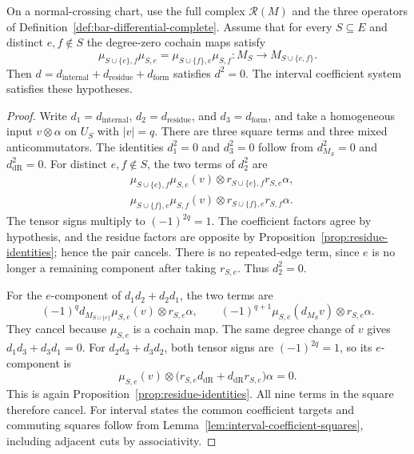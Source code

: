 \begin{theorem}
\label{thm:bar-nilpotency-complete}
On a normal-crossing chart, use the full complex $\mathcal R(M)$ and the three
operators of Definition~\ref{def:bar-differential-complete}.
Assume that for every $S\subseteq E$ and distinct $e,f\notin S$ the degree-zero
cochain maps satisfy
\[
\mu_{S\cup\{e\},f}\mu_{S,e}
=\mu_{S\cup\{f\},e}\mu_{S,f}
 :M_S\longrightarrow M_{S\cup\{e,f\}}.
\]
Then $d=d_{\mathrm{internal}}+d_{\mathrm{residue}}+d_{\mathrm{form}}$ satisfies $d^2=0$.
The interval coefficient system satisfies these hypotheses.
\end{theorem}

\begin{proof}
Write $d_1=d_{\mathrm{internal}}$, $d_2=d_{\mathrm{residue}}$,
and $d_3=d_{\mathrm{form}}$, and take a homogeneous input $v\otimes\alpha$
on $U_S$ with $|v|=q$.
There are three square terms and three mixed anticommutators.
The identities $d_1^2=0$ and $d_3^2=0$ follow from $d_{M_S}^2=0$
and $d_{\mathrm{dR}}^2=0$.
For distinct $e,f\notin S$, the two terms of $d_2^2$ are
\begin{align*}
&\mu_{S\cup\{e\},f}\mu_{S,e}(v)\otimes
 r_{S\cup\{e\},f}r_{S,e}\alpha,\\
&\mu_{S\cup\{f\},e}\mu_{S,f}(v)\otimes
 r_{S\cup\{f\},e}r_{S,f}\alpha.
\end{align*}
The tensor signs multiply to $(-1)^{2q}=1$.
The coefficient factors agree by hypothesis, and the residue factors are opposite by
Proposition~\ref{prop:residue-identities}; hence the pair cancels.
There is no repeated-edge term, since $e$ is no longer a remaining component after taking $r_{S,e}$.
Thus $d_2^2=0$.

For the $e$-component of $d_1d_2+d_2d_1$, the two terms are
\[
(-1)^q d_{M_{S\cup\{e\}}}\mu_{S,e}(v)\otimes r_{S,e}\alpha,
\qquad
(-1)^{q+1}\mu_{S,e}(d_{M_S}v)\otimes r_{S,e}\alpha.
\]
They cancel because $\mu_{S,e}$ is a cochain map.
The same degree change of $v$ gives
$d_1d_3+d_3d_1=0$.
For $d_2d_3+d_3d_2$, both tensor signs are $(-1)^{2q}=1$,
so its $e$-component is
\[
\mu_{S,e}(v)\otimes
\bigl(r_{S,e}d_{\mathrm{dR}}+d_{\mathrm{dR}}r_{S,e}\bigr)\alpha=0.
\]
This is again Proposition~\ref{prop:residue-identities}.
All nine terms in the square therefore cancel.
For interval states the common coefficient targets and commuting squares follow from
Lemma~\ref{lem:interval-coefficient-squares}, including adjacent cuts by associativity.
\end{proof}

